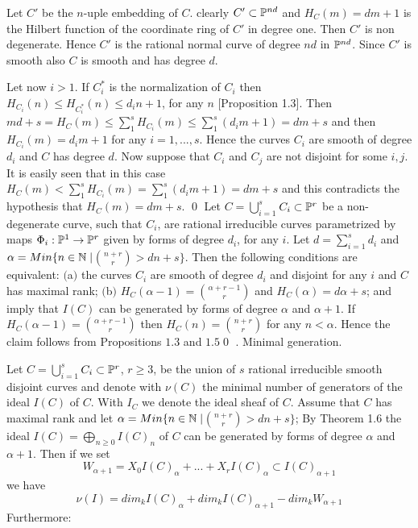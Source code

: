 Let $C'$ be the $n$-uple
embedding  of $C$. clearly $C'\subset \Bbb P^{nd}$ and $H_C(m)=dm+1$ is
the
Hilbert function of the coordinate ring of $C'$ in  degree one. Then $C'$
is non 
degenerate. Hence $C'$ is the rational normal curve of degree
$nd$ in $\Bbb P^{nd}$. Since $C'$ is smooth also $C$ is smooth and has
degree $d$.\medskip

Let now $i>1$. \medskip
If $ C_i^*$ is the normalization of $C_i$ then $H_{C_i}(n)\leq
H_{C_i^*}(n) \leq d_in+1$, for any $n$ [Proposition 1.3]. Then 
$md+s=H_C(m)\leq \sum_1^s H_{C_i}(m)\leq \sum_1^s(d_im+1)=dm+s$ and then 
$H_{C_i}(m) = d_im+1$ for any $i=1,...,s$. Hence the curves 
$C_i$ are smooth of degree $d_i$ and $C$ has degree $d$. Now suppose that 
$C_i$ and $C_j$ are not disjoint for some $i,j$. It is easily seen that in
this case
$H_C(m)< \sum_1^sH_{C_i}(m)=\sum_1^s(d_im+1)=dm+s$ and this contradicts
the
hypothesis that $H_C(m)=dm+s$.
 \qed\enddemo
{}  Let $C=$$\bigcup_{i=1}^s$$ C_i  \subset \Bbb P^r$
 be a  non-degenerate curve,  
such that $C_i$, are rational irreducible curves parametrized by  maps 
$\Phi_i:\Bbb P^1 \rightarrow \Bbb P^r$ 
given by forms
of degree $d_i$, for any $i$. Let $d=\sum_{i=1}^s d_i$ and
$\alpha=Min\{n\in\Bbb N\mid $$n+r\choose r$$ > dn+s\}$. Then the following
conditions are equivalent:\medskip
$($a$)$ the curves $C_i$ are smooth of degree $d_i$ and disjoint for any 
$i$ and $C$ has maximal rank; \medskip 
$($b$)$ $H_C(\alpha -1)=$$\alpha+r-1\choose r$$ $ and $H_C(\alpha)=d\alpha
+s$;\medskip
and imply that $I(C)$ can be generated by forms of degree $\alpha$ and
$\alpha+1$.\endproclaim
{} If $H_C(\alpha -1)=$$\alpha+r-1\choose r$$ $ then 
$H_C(n)=$$n+r\choose r$$ $ for any $n<\alpha$. Hence  the claim follows
from Propositions
$1.3$ and $1.5$\qed\enddemo
{}. Minimal generation.\endhead

Let $C=$$\bigcup_{i=1}^s$$ C_i  \subset \Bbb P^r$, $r\geq 3$,
be the union of $s$ rational irreducible smooth disjoint curves and denote
with
$\nu (C)$ the minimal number of generators of the ideal $I(C)$ of $C$. 
With $I_C$ we denote the
ideal sheaf of $C$.
Assume that $C$ has maximal rank and let
$\alpha=Min\{n\in\Bbb N\mid $$n+r\choose r$$ > dn+s\}$; 
By Theorem
1.6 the ideal 
$I(C)=\bigoplus_{n\geq 0}I(C)_n$ of $C$ can be generated by forms of
 degree  $\alpha$ and $\alpha+1$. Then if we set
 $$W_{\alpha+1}=X_0I(C)_\alpha+...+X_rI(C)_\alpha\subset I(C)_{\alpha+1}$$
we have $$\nu (I)=dim_kI(C)_{\alpha}+
dim_kI(C)_{\alpha+1}-dim_kW_{\alpha+1}$$
Furthermore:\medskip

